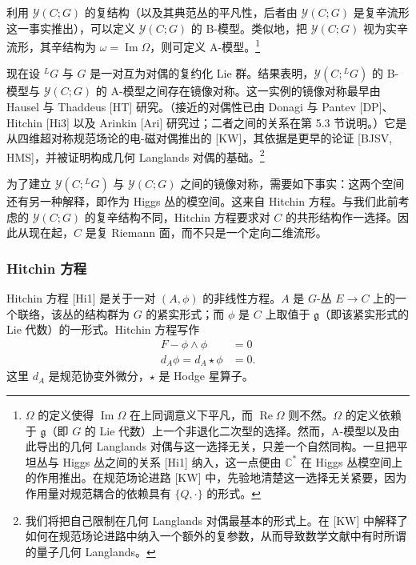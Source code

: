 利用 $\mathcal{Y}(C;G)$ 的复结构（以及其典范丛的平凡性，后者由 $\mathcal{Y}(C;G)$ 是复辛流形这一事实推出），可以定义 $\mathcal{Y}(C;G)$ 的 B-模型。类似地，把 $\mathcal{Y}(C;G)$ 视为实辛流形，其辛结构为 $\omega=\operatorname{Im}\Omega$，则可定义 A-模型。\footnote{$\Omega$ 的定义使得 $\operatorname{Im}\Omega$ 在上同调意义下平凡，而 $\operatorname{Re}\Omega$ 则不然。$\Omega$ 的定义依赖于 $\mathfrak{g}$（即 $G$ 的 Lie 代数）上一个非退化二次型的选择。然而，A-模型以及由此导出的几何 Langlands 对偶与这一选择无关，只差一个自然同构。一旦把平坦丛与 Higgs 丛之间的关系 [Hi1] 纳入，这一点便由 $\mathbb{C}^{*}$ 在 Higgs 丛模空间上的作用推出。在规范场论进路 [KW] 中，先验地清楚这一选择无关紧要，因为作用量对规范耦合的依赖具有 $\{Q,\cdot\}$ 的形式。}

现在设 ${}^{L}G$ 与 $G$ 是一对互为对偶的复约化 Lie 群。结果表明，$\mathcal{Y}(C;{}^{L}G)$ 的 B-模型与 $\mathcal{Y}(C;G)$ 的 A-模型之间存在镜像对称。这一实例的镜像对称最早由 Hausel 与 Thaddeus [HT] 研究。（接近的对偶性已由 Donagi 与 Pantev [DP]、Hitchin [Hi3] 以及 Arinkin [Ari] 研究过；二者之间的关系在第 5.3 节说明。）它是从四维超对称规范场论的电-磁对偶推出的 [KW]，其依据是更早的论证 [BJSV, HMS]，并被证明构成几何 Langlands 对偶的基础。\footnote{我们将把自己限制在几何 Langlands 对偶最基本的形式上。在 [KW] 中解释了如何在规范场论进路中纳入一个额外的复参数，从而导致数学文献中有时所谓的量子几何 Langlands。}


为了建立 $\mathcal{Y}(C;{}^{L}G)$ 与 $\mathcal{Y}(C;G)$ 之间的镜像对称，需要如下事实：这两个空间还有另一种解释，即作为 Higgs 丛的模空间。这来自 Hitchin 方程。与我们此前考虑的 $\mathcal{Y}(C;G)$ 的复辛结构不同，Hitchin 方程要求对 $C$ 的共形结构作一选择。因此从现在起，$C$ 是复 Riemann 面，而不只是一个定向二维流形。

\subsubsection{Hitchin 方程}

Hitchin 方程 [Hi1] 是关于一对 $(A,\phi)$ 的非线性方程。$A$ 是 $G$-丛 $E\to C$ 上的一个联络，该丛的结构群为 $G$ 的紧实形式；而 $\phi$ 是 $C$ 上取值于 $\mathfrak{g}$（即该紧实形式的 Lie 代数）的一形式。Hitchin 方程写作
\begin{equation}\tag{2.1}
\begin{aligned}
F - \phi\wedge\phi &= 0\\
d_A\phi = d_A\star\phi &= 0.
\end{aligned}
\end{equation}
这里 $d_A$ 是规范协变外微分，$\star$ 是 Hodge 星算子。

